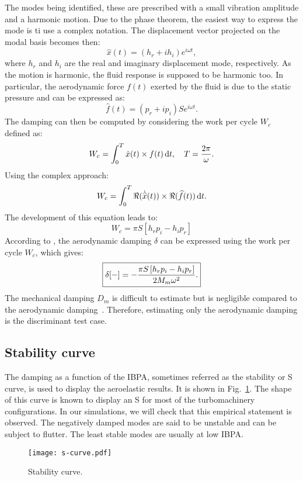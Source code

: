 The modes being identified, these are prescribed
with a small vibration amplitude and a harmonic motion.
Due to the phase theorem, the easiest way to express
the mode is ti use a complex notation.
The displacement vector projected on the modal basis becomes then:
\begin{equation}
   \widehat{x}(t) = (h_r + i h_i) e^{i \omega t},
   \label{eq:harm_vib_displ_vector}
\end{equation}
where $h_r$ and $h_i$ are the real and imaginary  displacement
mode, respectively.
As the motion is harmonic, the fluid response is
supposed to be harmonic too.
In particular, the aerodynamic force $f (t)$ exerted by the fluid is due to the
static pressure and can be expressed as:
\begin{equation}
    \widehat{f}(t) = (p_r + i p_i) S e^{i \omega t}.
\end{equation}
The damping can then be computed by considering the 
work per cycle $W_c$ defined as:
\begin{equation}
    W_c = \int_0^T \dot{x} (t) \times f(t) \mathop{}\!\mathrm{d} t, \quad T = \frac{2 \pi}{\omega}.
\end{equation}
Using the complex approach:
\begin{equation}
    W_c = \int_0^T \Re (\dot{\widehat{x}} (t)) \times \Re (\widehat{f}(t)) \mathop{}\!\mathrm{d} t.
\end{equation}
The development of this equation leads to:
\begin{equation}
    W_c = \pi S \left[h_r p_i - h_i p_r \right]
\end{equation}
According to \citet{Carta1967}, the aerodynamic 
damping $\delta$ can be expressed using the
work per cycle $W_c$, which gives:
\begin{equation}
    \fbox{$
    \delta [-] = - \displaystyle \frac{\pi S \left[h_r p_i - h_i p_r \right]}{2 M_m \omega^2}.
    $}
\end{equation}
The mechanical damping $D_m$ is difficult to estimate
but is negligible compared to the aerodynamic damping~\cite{Mikolajczak1975}.
Therefore, estimating only the aerodynamic damping is the discriminant test case.

\subsection{Stability curve}
\label{sub:s_curve}

The damping as a function of the IBPA, sometimes
referred as the stability or S curve, is used to
display the aeroelastic results. It is shown in
Fig.~\ref{fig:s-curve}. The shape of this curve is
known to display an S for most of the
turbomachinery configurations. 
In our simulations, we will check that this empirical
statement is observed.
The negatively damped modes are said to
be unstable and can be subject to flutter. 
The least stable modes are usually at low IBPA.
\begin{figure}[htp]
  \centering
  \texttt{[image: s-curve.pdf]}
  \caption{Stability curve.}
  \label{fig:s-curve}
\end{figure}
